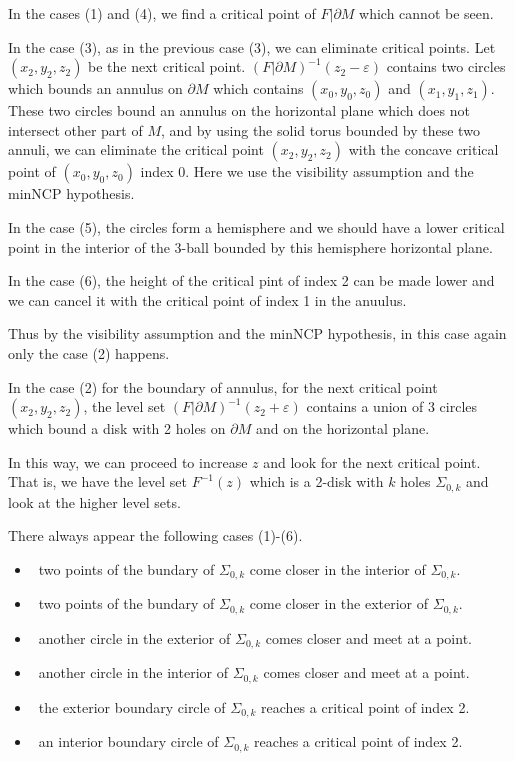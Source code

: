 \documentclass{amsart}
\numberwithin{equation}{section}
\newcommand{\bd}{\partial}
\begin{document}
In the cases (1) and (4), we find a critical point of $F|\bd M$ which cannot be seen.

In the case (3), as in the previous case (3), we can eliminate critical points. Let $(x_2,y_2,z_2)$ be the next critical point. 
$(F|\bd M)^{-1}(z_2-\varepsilon)$ contains two circles which bounds an annulus on $\bd M$ which contains $(x_0,y_0,z_0)$ and $(x_1,y_1,z_1)$. These two circles bound an annulus on the horizontal plane which does not intersect other part of $M$, and by using the solid torus bounded by these two annuli, we can eliminate the critical point $(x_2,y_2,z_2)$ with the concave critical point of $(x_0,y_0,z_0)$ index 0. Here we use the visibility assumption and the minNCP hypothesis.

In the case (5), the circles form a hemisphere and we should have a lower critical point in the interior of the 3-ball bounded by this hemisphere horizontal plane.

In the case (6), the height of the critical pint of index 2 can be made lower and we can cancel it with the critical point of index 1 in the anuulus. 

Thus by the visibility assumption and the minNCP hypothesis, in this case again only the case (2) happens.

In the case (2) for the boundary of annulus, for the next critical point $(x_2,y_2,z_2)$, the level set $(F|\bd M)^{-1}(z_2+\varepsilon)$ contains a union of 3 circles which bound a disk with 2 holes on $\bd M$ and on the horizontal  plane.

In this way, we can proceed to increase $z$ and look for the next critical point.  
That is, we have the level set $F^{-1}(z)$ which is a 2-disk with $k$ holes $\varSigma_{0,k}$ and look at the  higher level sets.

There always appear the following cases (1)-(6).
\begin{itemize}
\item[(1)]\ 
 two points of the bundary of $\varSigma_{0,k}$ come closer in the interior of $\varSigma_{0,k}$.
\item[(2)]\ 
 two points of the bundary of $\varSigma_{0,k}$ come closer in the exterior of $\varSigma_{0,k}$.
\item[(3)]\ 
 another circle in the exterior of $\varSigma_{0,k}$ comes closer and meet at a point.
\item[(4)]\ 
 another circle in the interior of $\varSigma_{0,k}$  comes closer and meet at a point.
\item[(5)]\ 
the exterior boundary circle of $\varSigma_{0,k}$ reaches a critical point of index 2. 

\item[(6)]\ 
an interior boundary circle of $\varSigma_{0,k}$ reaches a critical point of index 2. 
\end{itemize}
\end{document}
